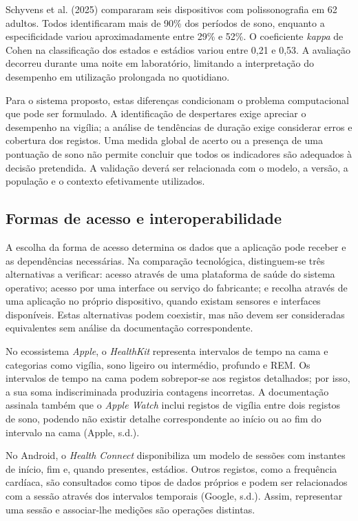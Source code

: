 Schyvens et al. (2025) compararam seis dispositivos com polissonografia em 62 adultos. Todos identificaram mais de 90\% dos períodos de sono, enquanto a especificidade variou aproximadamente entre 29\% e 52\%. O coeficiente \textit{kappa} de Cohen na classificação dos estados e estádios variou entre 0,21 e 0,53. A avaliação decorreu durante uma noite em laboratório, limitando a interpretação do desempenho em utilização prolongada no quotidiano.

Para o sistema proposto, estas diferenças condicionam o problema computacional que pode ser formulado. A identificação de despertares exige apreciar o desempenho na vigília; a análise de tendências de duração exige considerar erros e cobertura dos registos. Uma medida global de acerto ou a presença de uma pontuação de sono não permite concluir que todos os indicadores são adequados à decisão pretendida. A validação deverá ser relacionada com o modelo, a versão, a população e o contexto efetivamente utilizados.

\subsection{Formas de acesso e interoperabilidade}
\label{sec:chap3_wearableInteroperability}

A escolha da forma de acesso determina os dados que a aplicação pode receber e as dependências necessárias. Na comparação tecnológica, distinguem-se três alternativas a verificar: acesso através de uma plataforma de saúde do sistema operativo; acesso por uma interface ou serviço do fabricante; e recolha através de uma aplicação no próprio dispositivo, quando existam sensores e interfaces disponíveis. Estas alternativas podem coexistir, mas não devem ser consideradas equivalentes sem análise da documentação correspondente.

No ecossistema \textit{Apple}, o \textit{HealthKit} representa intervalos de tempo na cama e categorias como vigília, sono ligeiro ou intermédio, profundo e REM. Os intervalos de tempo na cama podem sobrepor-se aos registos detalhados; por isso, a sua soma indiscriminada produziria contagens incorretas. A documentação assinala também que o \textit{Apple Watch} inclui registos de vigília entre dois registos de sono, podendo não existir detalhe correspondente ao início ou ao fim do intervalo na cama (Apple, s.d.).

No Android, o \textit{Health Connect} disponibiliza um modelo de sessões com instantes de início, fim e, quando presentes, estádios. Outros registos, como a frequência cardíaca, são consultados como tipos de dados próprios e podem ser relacionados com a sessão através dos intervalos temporais (Google, s.d.). Assim, representar uma sessão e associar-lhe medições são operações distintas.

